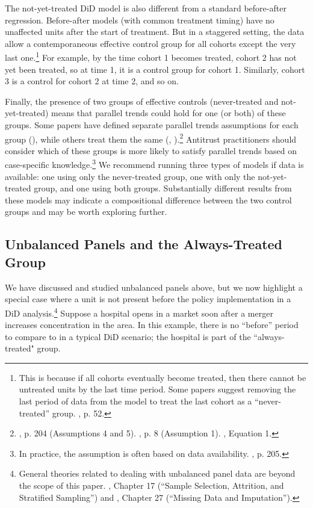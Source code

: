 \documentclass[12pt]{article}
\begin{document}
The not-yet-treated DiD model is also different from a standard before-after regression. Before-after models (with common treatment timing) have no unaffected units after the start of treatment. But in a staggered setting, the data allow a contemporaneous effective control group for all cohorts except the very last one.\footnote{This is because if all cohorts eventually become treated, then there cannot be untreated units by the last time period. Some papers suggest removing the last period of data from the model to treat the last cohort as a “never-treated” group. \citet{wooldridge2021two}, p. 52.}  For example, by the time cohort 1 becomes treated, cohort 2 has not yet been treated, so at time 1, it is a control group for cohort 1. Similarly, cohort 3 is a control for cohort 2 at time 2, and so on.

Finally, the presence of two groups of effective controls (never-treated and not-yet-treated) means that parallel trends could hold for one (or both) of these groups. Some papers have defined separate parallel trends assumptions for each group (\citet{CS2021}), while others treat them the same (\citet{borusyak2024revisiting}, \citet{gardner2022a}).\footnote{\citet{CS2021}, p. 204 (Assumptions 4 and 5). \citet{borusyak2024revisiting}, p. 8 (Assumption 1). \citet{gardner2022a}, Equation 1.}  Antitrust practitioners should consider which of these groups is more likely to satisfy parallel trends based on case-specific knowledge.\footnote{In practice, the assumption is often based on data availability. \citet{CS2021}, p. 205.}  We recommend running three types of models if data is available: one using only the never-treated group, one with only the not-yet-treated group, and one using both groups. Substantially different results from these models may indicate a compositional difference between the two control groups and may be worth exploring further.

\subsection{Unbalanced Panels and the Always-Treated Group} \label{sec:unbalanced}
We have discussed and studied unbalanced panels above, but we now highlight a special case where a unit is not present before the policy implementation in a DiD analysis.\footnote{General theories related to dealing with unbalanced panel data are beyond the scope of this paper. \citet{wooldridge2010a}, Chapter 17 (“Sample Selection, Attrition, and Stratified Sampling”) and \citet{cameron2020}, Chapter 27 (“Missing Data and Imputation”).} Suppose a hospital opens in a market soon after a merger increases concentration in the area. In this example, there is no “before” period to compare to in a typical DiD scenario; the hospital is part of the ``always-treated" group.
\end{document}
